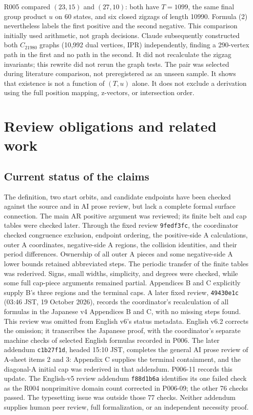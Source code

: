 \documentclass[11pt]{amsart}
\newcommand{\record}[1]{\nolinkurl{#1}}
\begin{document}
R005 compared $(23,15)$ and $(27,10)$: both have $T=1099$, the same
final group product $u$ on 60 states, and six closed zigzags of length
10990. Formula (2) nevertheless labels the first positive and the
second negative. This comparison initially used arithmetic, not graph
decisions. Claude subsequently constructed both $C_{21980}$ graphs
(10,992 dual vertices, IPR) independently, finding a 290-vertex path
in the first and no path in the second. It did not recalculate the
zigzag invariants; this rewrite did not rerun the graph tests.
The pair was selected during literature comparison, not preregistered
as an unseen sample. It shows that existence is not a function of
$(T,u)$ alone. It does not exclude a derivation using the full position
mapping, z-vectors, or intersection order.

\section{Review obligations and related work}\label{sec:review}
\subsection{Current status of the claims}
The definition, two start orbits, and candidate endpoints have been
checked against the source and in AI prose review, but lack a complete
formal surface connection. The main AR positive argument was reviewed;
its finite belt and cap tables were checked later. Through the fixed
review \record{9fedf3fc}, the coordinator checked congruence exclusion,
endpoint ordering, the positive-side A calculations, outer A coordinates,
negative-side A regions, the collision identities, and their period
differences. Ownership of all outer A pieces and some negative-side A
lower bounds retained abbreviated steps. The periodic transfer of the
finite tables was rederived. Signs, small widths, simplicity, and degrees
were checked, while some full cap-piece arguments remained partial.
Appendices B and C explicitly supply B's three regions and the terminal
caps. A later fixed review, \record{49430e1c} (03:46 JST, 19 October
2026), records the coordinator's recalculation of all formulas in the
Japanese v4 Appendices B and C, with no missing steps found. This review
was omitted from English v6's status metadata. English v6.2 corrects the
omission; it transcribes the Japanese proof, with the coordinator's
separate machine checks of selected English formulas recorded in P006.
The later addendum \record{c1b27f1d}, headed 15:10 JST, completes
the general AI prose review of A-sheet items 2 and 3: Appendix C
supplies the terminal containment, and the diagonal-A initial cap
was rederived in that addendum. P006-11 records this update.
The English-v5 review addendum \record{f88d1b6a} identifies its one
failed check as the R004 nonprimitive domain count corrected in
P006-09; the other 76 checks passed. The typesetting issue was
outside those 77 checks. Neither addendum supplies human peer
review, full formalization, or an independent necessity proof.
\end{document}
